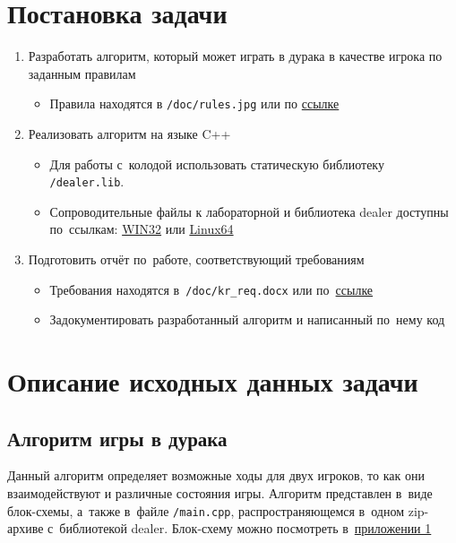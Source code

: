 \documentclass[a4paper,12pt]{article}
\begin{document}
    \section{Постановка задачи}
        \begin{enumerate}
            \item Разработать алгоритм, который может играть в дурака в качестве игрока по заданным правилам
            \begin{itemize}
                \item Правила находятся в \texttt{/doc/rules.jpg} или по \href{http://13633-oop.mooo.com/files/durak.docx}{ссылке}
            \end{itemize}
            \item Реализовать алгоритм на языке C++
            \begin{itemize}
                \item Для работы с~колодой использовать статическую библиотеку \texttt{/dealer.lib}.
                \item Сопроводительные файлы к лабораторной и библиотека \textsf{dealer} доступны по~ссылкам: \href{http://13633-oop.mooo.com/files/dealer_vs2019.zip}{WIN32} или \href{http://13633-oop.mooo.com/files/dealer_x86_64.zip}{Linux64}
            \end{itemize}
            \item Подготовить отчёт по~работе, соответствующий требованиям
            \begin{itemize}
                \item Требования находятся в~\texttt{/doc/kr\_req.docx} или по~\href{http://13633-oop.mooo.com/files/kr_req.docx}{ссылке}
                \item Задокументировать разработанный алгоритм и написанный по~нему код
            \end{itemize}
        \end{enumerate}

    \section{Описание исходных данных задачи}

    \subsection{Алгоритм игры в дурака}
        Данный алгоритм определяет возможные ходы для двух игроков, то как они взаимодействуют и различные состояния игры.
        Алгоритм представлен в~виде блок-схемы, а~также в~файле \texttt{/main.cpp},
        распространяющемся в~одном zip-архиве с~библиотекой dealer.
        Блок-схему можно посмотреть в~\hyperlink{rulesimg}{приложении 1}
\end{document}
